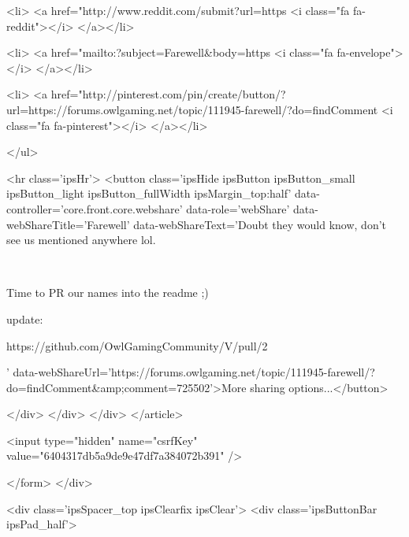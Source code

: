 			<li>
<a href="http://www.reddit.com/submit?url=https%
	<i class="fa fa-reddit"></i>
</a></li>
		
			<li>
<a href="mailto:?subject=Farewell&body=https%
	<i class="fa fa-envelope"></i>
</a></li>
		
			<li>
<a href="http://pinterest.com/pin/create/button/?url=https://forums.owlgaming.net/topic/111945-farewell/?do=findComment%
	<i class="fa fa-pinterest"></i>
</a></li>
		
	</ul>


	<hr class='ipsHr'>
	<button class='ipsHide ipsButton ipsButton_small ipsButton_light ipsButton_fullWidth ipsMargin_top:half' data-controller='core.front.core.webshare' data-role='webShare' data-webShareTitle='Farewell' data-webShareText='Doubt they would know, don’t see us mentioned anywhere lol.
 


	 
 


	Time to PR our names into the readme ;)
 


	update:
 


	https://github.com/OwlGamingCommunity/V/pull/2
 
' data-webShareUrl='https://forums.owlgaming.net/topic/111945-farewell/?do=findComment&amp;comment=725502'>More sharing options...</button>

	
</div>
</div>
	</div>
</article>
					
				
			
			
<input type="hidden" name="csrfKey" value="6404317db5a9de9e47df7a384072b391" />


		</form>
	</div>

	
	
		<div class='ipsSpacer_top ipsClearfix ipsClear'>
			<div class='ipsButtonBar ipsPad_half'>


